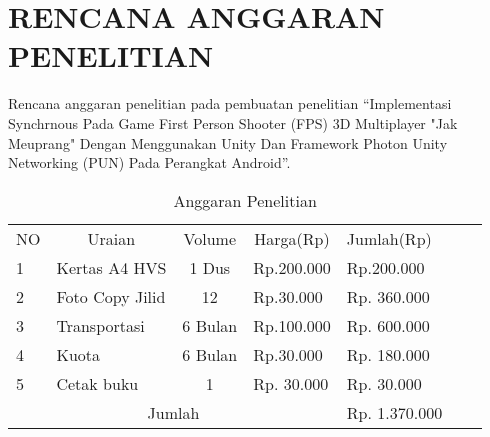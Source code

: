 \chapter*{RENCANA ANGGARAN PENELITIAN}
Rencana anggaran penelitian pada pembuatan penelitian “Implementasi Synchrnous Pada Game First Person Shooter (FPS) 3D Multiplayer "Jak Meuprang" Dengan Menggunakan Unity Dan Framework Photon Unity Networking (PUN) Pada Perangkat Android”.

\begin{table}[h]
    \centering
    \begin{tabular}{|llcl|l|ll}
    \cline{1-5}
    \multicolumn{1}{|c|}{NO} & \multicolumn{1}{c|}{Uraian}          & \multicolumn{1}{c|}{Volume}  & \multicolumn{1}{c|}{Harga(Rp)} & Jumlah(Rp)    &  &  \\ \cline{1-5}
    \multicolumn{1}{|l|}{1}  & \multicolumn{1}{l|}{Kertas A4 HVS}   & \multicolumn{1}{c|}{1 Dus}   & Rp.200.000                     & Rp.200.000    &  &  \\ \cline{1-5}
    \multicolumn{1}{|l|}{2}  & \multicolumn{1}{l|}{Foto Copy Jilid} & \multicolumn{1}{c|}{12}      & Rp.30.000                      & Rp. 360.000   &  &  \\ \cline{1-5}
    \multicolumn{1}{|l|}{3}  & \multicolumn{1}{l|}{Transportasi}    & \multicolumn{1}{c|}{6 Bulan} & Rp.100.000                     & Rp. 600.000   &  &  \\ \cline{1-5}
    \multicolumn{1}{|l|}{4}  & \multicolumn{1}{l|}{Kuota}           & \multicolumn{1}{c|}{6 Bulan} & Rp.30.000                      & Rp. 180.000   &  &  \\ \cline{1-5}
    \multicolumn{1}{|l|}{5}  & \multicolumn{1}{l|}{Cetak buku}      & \multicolumn{1}{c|}{1}       & Rp. 30.000                     & Rp. 30.000    &  &  \\ \cline{1-5}
    \multicolumn{4}{|c|}{Jumlah}                                                                                                    & Rp. 1.370.000 &  &  \\ \cline{1-5}
    \end{tabular}
    \caption{Anggaran Penelitian}
    \label{lab:label-anggaran}
    \end{table}